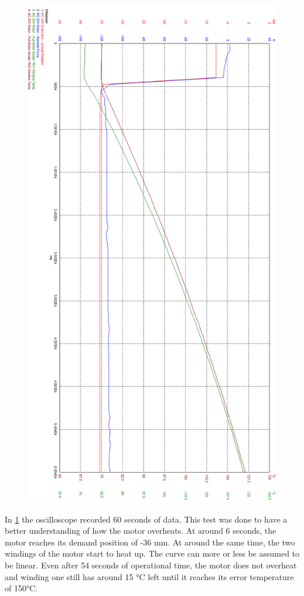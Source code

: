 \begin{figure}
	\centering
	\includegraphics[width=0.7\linewidth]{pictures_figures/oscilloscope_neg36_rot}
	\caption{}
	\label{fig:oscilloscopeneg36rot}
\end{figure}


In \cref{fig:oscilloscopeneg36rot} the oscilloscope recorded 60 seconds of data. This test was done to have a better understanding of how the motor overheats. At around 6 seconds, the motor reaches its demand position of -36 mm. At around the same time, the two windings of the motor start to heat up. The curve can more or less be assumed to be linear. Even after 54 seconds of operational time, the motor does not overheat and winding one still has around 15 °C left until it reaches its error temperature of 150°C. 

